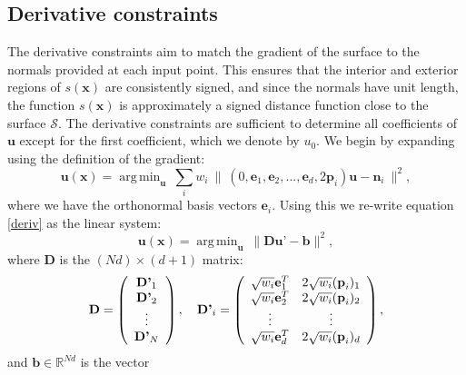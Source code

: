 \documentclass[final,3p,times,twocolumn]{elsarticle}
\DeclareMathOperator*{\argmin}{arg\,min}
\begin{document}
\subsection{Derivative constraints}
The derivative constraints aim to match the gradient of the surface
to the normals provided at each input point. This ensures that the interior and
exterior regions of $s(\textbf{x})$ are consistently signed, and since the normals have unit length,
the function $s(\textbf{x})$ is approximately a signed distance function close to the surface $\mathcal{S}$.
The derivative constraints are sufficient to determine all coefficients of $\textbf{u}$ except for the first
coefficient, which we denote by $u_0$.
We begin by expanding using the definition of the gradient:
\begin{equation}
\label{gradmin}
 \textbf{u}(\textbf{x}) = \argmin_{\textbf{u}} \ \sum_i w_i \ \lVert \ (0, \textbf{e}_1, \textbf{e}_2, ..., \textbf{e}_d, 2\textbf{p}_i) \textbf{u} - \textbf{n}_i \ \rVert^2,
\end{equation}
where we have the orthonormal basis vectors $\textbf{e}_i$.
Using this we re-write equation \ref{deriv} as the linear system:
\begin{equation}
\label{linsys}
 \textbf{u}(\textbf{x}) = \argmin_{\textbf{u}} \ \lVert \textbf{D} \textbf{u'} - \textbf{b} \rVert^2,
\end{equation}
where $\textbf{D}$ is the $(Nd) \times (d+1)$ matrix:
\begin{equation}
 \textbf{D} = \left( \begin{array}{c}
                \textbf{D'}_1 \\
                 \textbf{D'}_2 \\
                 \vdots \\
                  \textbf{D'}_N
              \end{array} \right) ,
\quad
               \textbf{D'}_i = \left( \begin{array}{c c}
               \sqrt{w_i} \textbf{e}_1^T & 2 \sqrt{w_i} (\textbf{p}_i)_1 \\
               \sqrt{w_i} \textbf{e}_2^T & 2 \sqrt{w_i} (\textbf{p}_i)_2 \\
               \vdots & \vdots \\
               \sqrt{w_i} \textbf{e}_d^T & 2 \sqrt{w_i} (\textbf{p}_i)_d \\
              \end{array} \right) ,
\end{equation}
and $\textbf{b} \in \mathbb{R}^{Nd} $ is the vector 
\end{document}

